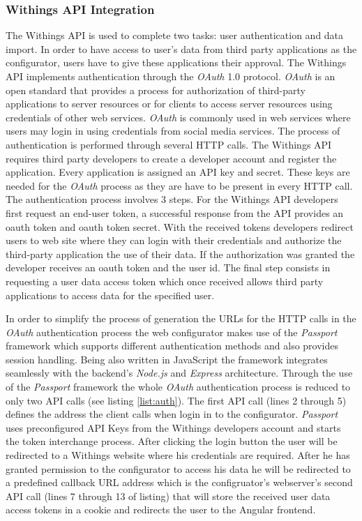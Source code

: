 \documentclass[../medieninformatik-arbeit.tex]{subfiles}
\begin{document}
\subsubsection{Withings API Integration}
\label{sub:ApiIntegration}
The Withings API is used to complete two tasks: user authentication and data import. In order to have access to user's data from third party applications as the configurator, users have to give these applications their approval. The Withings API implements authentication through the \textit{OAuth} 1.0 protocol. \textit{OAuth} is an open standard that provides a process for authorization of third-party applications to server resources or for clients to access server resources using credentials of other web services\cite{hammer2010oauth}. \textit{OAuth} is commonly used in web services where users may login in using credentials from social media services. The process of authentication is performed through several HTTP calls. The Withings API requires third party developers to create a developer account and register the application. Every application is assigned an API key and secret. These keys are needed for the \textit{OAuth} process as they are have to be present in every HTTP call. The authentication process involves 3 steps. For the Withings API developers first request an end-user token, a successful response from the API provides an oauth token and oauth token secret. With the received tokens developers redirect users to web site where they can login with their credentials and authorize the third-party application the use of their data. If the authorization was granted the developer receives an oauth token and the user id. The final step consists in requesting a user data access token which once received allows third party applications to access data for the specified user. 

In order to simplify the process of generation the URLs for the HTTP calls in the \textit{OAuth} authentication process the web configurator makes use of the \textit{Passport}\cite{passport} framework which supports different authentication methods and also provides session handling. Being also written in JavaScript the framework integrates seamlessly with the backend's \textit{Node.js} and \textit{Express} architecture. Through the use of the \textit{Passport} framework the whole \textit{OAuth} authentication process is reduced to only two API calls (see listing \ref{list:auth}). The first API call (lines 2 through 5) defines the address the client calls when login in to the configurator. \textit{Passport} uses preconfigured API Keys from the Withings developers account and starts the token interchange process. After clicking the login button the user will be redirected to a Withings website where his credentials are required. After he has granted permission to the configurator to access his data he will be redirected to a predefined callback URL address which is the configruator's webserver's second API call (lines 7 through 13 of listing) that will store the received user data access tokens in a cookie and redirects the user to the Angular frontend. 
\end{document}
